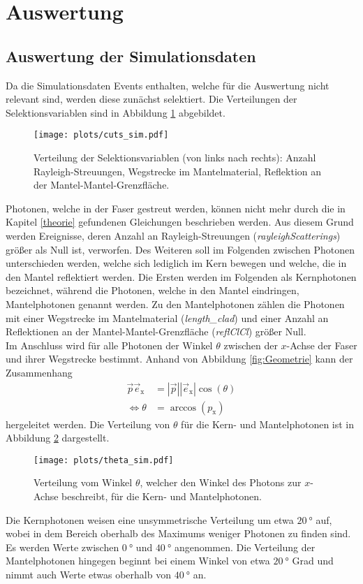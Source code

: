 \section{Auswertung}

\subsection{Auswertung der Simulationsdaten}
Da die Simulationsdaten Events enthalten, welche für die Auswertung nicht relevant sind, werden diese zunächst selektiert. Die Verteilungen der Selektionsvariablen sind in Abbildung \ref{fig:Cuts_sim} abgebildet.
\begin{figure}
    \centering
    \texttt{[image: plots/cuts\_sim.pdf]}
    \caption{Verteilung der Selektionsvariablen (von links nach rechts): Anzahl Rayleigh-Streuungen, Wegstrecke im Mantelmaterial, Reflektion an der Mantel-Mantel-Grenzfläche.}
    \label{fig:Cuts_sim}
  \end{figure}
  \FloatBarrier
Photonen, welche in der Faser gestreut werden, können nicht mehr durch die in Kapitel \ref{theorie} gefundenen Gleichungen beschrieben werden. Aus diesem Grund werden Ereignisse, deren Anzahl an Rayleigh-Streuungen (\textit{rayleighScatterings}) größer als Null ist, verworfen.
Des Weiteren soll im Folgenden zwischen Photonen unterschieden werden, welche sich lediglich im Kern bewegen und welche, die in den Mantel reflektiert werden. Die Ersten werden im Folgenden als Kernphotonen bezeichnet, während die Photonen, welche in den Mantel eindringen, Mantelphotonen genannt werden.
Zu den Mantelphotonen zählen die Photonen mit einer Wegstrecke im Mantelmaterial (\textit{length\_clad}) und einer Anzahl an Reflektionen an der Mantel-Mantel-Grenzfläche (\textit{reflClCl}) größer Null. \\

Im Anschluss wird für alle Photonen der Winkel $\theta$ zwischen der $x$-Achse der Faser und ihrer Wegstrecke bestimmt. Anhand von Abbildung \ref{fig:Geometrie} kann der Zusammenhang
\begin{align}
    \vec{p}\vec{e}_{\mathrm{x}} &= |\vec{p}||\vec{e}_{\mathrm{x}}| \cos(\theta) \\
    \Leftrightarrow \theta &= \arccos(p_{\mathrm{x}})
\end{align}
hergeleitet werden. Die Verteilung von $\theta$ für die Kern- und Mantelphotonen ist in Abbildung \ref{fig:theta_sim} dargestellt.
\begin{figure}
    \centering
    \texttt{[image: plots/theta\_sim.pdf]}
    \caption{Verteilung vom Winkel $\theta$, welcher den Winkel des Photons zur $x$-Achse beschreibt, für die Kern- und Mantelphotonen.}
    \label{fig:theta_sim}
\end{figure}
\FloatBarrier
Die Kernphotonen weisen eine unsymmetrische Verteilung um etwa $\SI{20}{°}$ auf, wobei in dem Bereich oberhalb des Maximums weniger Photonen zu finden sind. Es werden Werte zwischen $\SI{0}{°}$ und $\SI{40}{°}$ angenommen. Die Verteilung der Mantelphotonen hingegen beginnt bei einem Winkel von etwa $\SI{20}{°}$ Grad und nimmt auch Werte etwas oberhalb von $\SI{40}{°}$ an.\\

